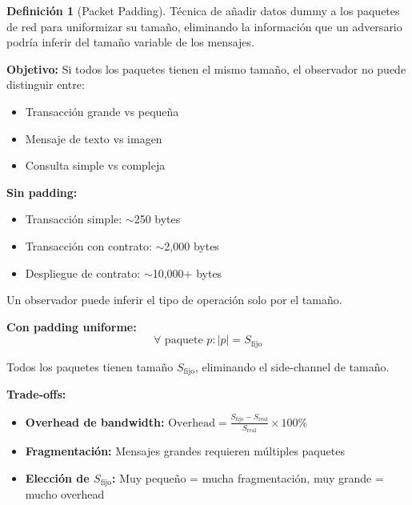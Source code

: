 \documentclass[11pt,a4paper,twoside]{book}
\theoremstyle{definition}
\newtheorem{definition}{Definición}[chapter]
\theoremstyle{remark}
\begin{document}
\begin{definition}[Packet Padding]
Técnica de añadir datos dummy a los paquetes de red para uniformizar su tamaño, eliminando la información que un adversario podría inferir del tamaño variable de los mensajes.

\textbf{Objetivo:} Si todos los paquetes tienen el mismo tamaño, el observador no puede distinguir entre:
\begin{itemize}
    \item Transacción grande vs pequeña
    \item Mensaje de texto vs imagen
    \item Consulta simple vs compleja
\end{itemize}
\end{definition}

\begin{mathnote}
\textbf{Sin padding:}
\begin{itemize}
    \item Transacción simple: $\sim$250 bytes
    \item Transacción con contrato: $\sim$2,000 bytes
    \item Despliegue de contrato: $\sim$10,000+ bytes
\end{itemize}

Un observador puede inferir el tipo de operación solo por el tamaño.

\textbf{Con padding uniforme:}
\[
\forall \text{ paquete } p: |p| = S_{\text{fijo}}
\]

Todos los paquetes tienen tamaño $S_{\text{fijo}}$, eliminando el side-channel de tamaño.

\textbf{Trade-offs:}
\begin{itemize}
    \item \textbf{Overhead de bandwidth:} $\text{Overhead} = \frac{S_{\text{fijo}} - S_{\text{real}}}{S_{\text{real}}} \times 100\%$
    \item \textbf{Fragmentación:} Mensajes grandes requieren múltiples paquetes
    \item \textbf{Elección de $S_{\text{fijo}}$:} Muy pequeño = mucha fragmentación, muy grande = mucho overhead
\end{itemize}
\end{mathnote}
\end{document}
